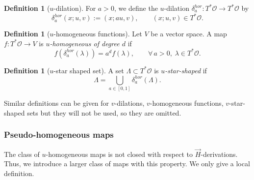 \documentclass[11pt,a4paper]{article}
\theoremstyle{plain}
\theoremstyle{definition}
\newtheorem{definition}[theorem]{Definition}
\theoremstyle{remark}
\numberwithin{equation}{section}
\begin{document}
\begin{definition}[$u$-dilation]
For $a>0$, we define the $u$-dilation $\delta_a^{hor} :T^*\mathcal{O}\to T^*\mathcal{O}$ by
\begin{equation}
\delta_a^{hor}(x;u,v) :=(x;au,v),\qquad (x;u,v)\in T^*\mathcal{O}.
\end{equation}
\end{definition}
\begin{definition}[$u$-homogeneous functions]
Let $V$ be a vector space. A map $f: T^*\mathcal{O} \to V$ is \emph{$u$-homogeneous of degree $d$} if 
\begin{equation}
f(\delta_a^{hor}(\lambda)) = a^d f(\lambda),\qquad \forall\, a>0,\; \lambda \in T^*\mathcal{O}.
\end{equation}
\end{definition}
\begin{definition}[$u$-star shaped set]
A set $\Lambda\subset T^*\mathcal{O}$ is \emph{$u$-star-shaped} if
\begin{equation}\label{eq:strip}
\Lambda = \bigcup_{a\in [0,1]} \delta_a^{hor}(\Lambda).
\end{equation}
\end{definition}
Similar definitions can be given for $v$-dilations, $v$-homogeneous functions, $v$-star-shaped sets but they will not be used, so they are omitted.

\subsubsection{Pseudo-homogeneous maps}

The class of $u$-homogeneous maps is not closed with respect to $\vec{H}$-derivations. Thus, we introduce a larger class of maps with this property. We only give a local definition.
\end{document}
